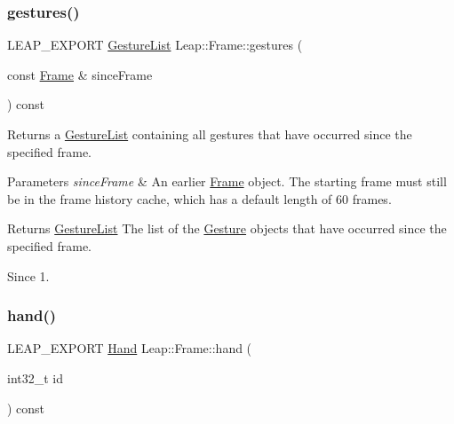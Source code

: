 \subsubsection{\texorpdfstring{gestures()}{gestures()}\hspace{0.1cm}{\footnotesize\ttfamily [2/2]}}
{\footnotesize\ttfamily L\+E\+A\+P\+\_\+\+E\+X\+P\+O\+RT \hyperlink{class_leap_1_1_gesture_list}{Gesture\+List} Leap\+::\+Frame\+::gestures (\begin{DoxyParamCaption}\item[{const \hyperlink{class_leap_1_1_frame}{Frame} \&}]{since\+Frame }\end{DoxyParamCaption}) const}

Returns a \hyperlink{class_leap_1_1_gesture_list}{Gesture\+List} containing all gestures that have occurred since the specified frame.


\begin{DoxyCodeInclude}
\end{DoxyCodeInclude}



\begin{DoxyParams}{Parameters}
{\em since\+Frame} & An earlier \hyperlink{class_leap_1_1_frame}{Frame} object. The starting frame must still be in the frame history cache, which has a default length of 60 frames. \\
\hline
\end{DoxyParams}
\begin{DoxyReturn}{Returns}
\hyperlink{class_leap_1_1_gesture_list}{Gesture\+List} The list of the \hyperlink{class_leap_1_1_gesture}{Gesture} objects that have occurred since the specified frame. 
\end{DoxyReturn}
\begin{DoxySince}{Since}
1. 
\end{DoxySince}
\mbox{\label{class_leap_1_1_frame_aa5bfff6dba5e38bb779716ec309f1966}} 
\subsubsection{\texorpdfstring{hand()}{hand()}}
{\footnotesize\ttfamily L\+E\+A\+P\+\_\+\+E\+X\+P\+O\+RT \hyperlink{class_leap_1_1_hand}{Hand} Leap\+::\+Frame\+::hand (\begin{DoxyParamCaption}\item[{int32\+\_\+t}]{id }\end{DoxyParamCaption}) const}

